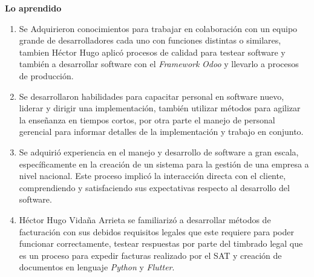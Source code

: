 \documentclass[protocolo.tex]{subfiles}
\begin{document}
\textbf{Lo aprendido}
\begin{enumerate}
\item Se Adquirieron conocimientos para trabajar en colaboración con un equipo grande de desarrolladores cada uno
con funciones distintas o similares, tambien Héctor Hugo aplicó procesos de calidad para testear software y
también a desarrollar software con el \textit{Framework} \textit{Odoo} y llevarlo a procesos de producción.


\item Se desarrollaron habilidades para capacitar personal en software nuevo, liderar y dirigir una
implementación, también utilizar métodos para agilizar la enseñanza en tiempos cortos, por
otra parte el manejo de personal gerencial para informar detalles de la implementación y
trabajo en conjunto.


\item Se adquirió experiencia en el manejo y desarrollo de software a gran escala, específicamente en la creación de un sistema para la gestión de una empresa a nivel nacional. Este proceso implicó la interacción directa con el cliente,  comprendiendo y satisfaciendo sus expectativas respecto al desarrollo del software.

\item Héctor Hugo Vidaña Arrieta se familiarizó a desarrollar métodos de facturación con sus debidos requisitos legales que este
requiere para poder funcionar correctamente, testear respuestas por parte del timbrado legal que es un proceso para expedir facturas realizado por el SAT
y creación de documentos en lenguaje \textit{Python} y \textit{Flutter}.

\end{enumerate}
\end{document}
